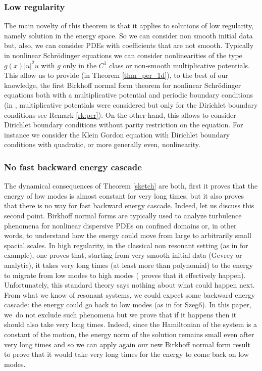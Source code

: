 \documentclass[JEP,XML,SOM,Unicode,NoEqCountersInSection,published]{cedram}
\theoremstyle{definition}
\begin{document}
\subsubsection*{Low regularity}
The main novelty of this theorem is that it applies to solutions of low regularity, namely solution in the energy space. So we can consider non smooth initial data but, also, we can consider PDEs with coefficients that are not smooth. Typically in nonlinear Schrödinger equations we can consider nonlinearities of the type $g(x)|u|^2u$ with $g$ only in the $C^1$ class or non-smooth multiplicative potentials. This allow us to provide (in Theorem \ref{thm_per_1d}), to the best of our knowledge, the first Birkhoff normal form theorem for nonlinear Schrödinger equations both with a multiplicative potential and periodic boundary conditions (in \cite{BG06}, multiplicative potentials were considered but only for the Dirichlet boundary conditions see Remark \ref{rk:per}). On the other hand, this allows to consider Dirichlet boundary conditions without parity restriction on the equation. For instance we consider the Klein Gordon equation with Dirichlet boundary conditions with quadratic, or more generally even, nonlinearity.

\subsubsection*{No fast backward energy cascade}
The dynamical consequences of Theorem \ref{sketch} are both, first it proves that the energy of low modes is almost constant for very long times, but it also proves that there is no way for fast backward energy cascade. Indeed, let us discuss this second point. Birkhoff normal forms are typically used to analyze turbulence phenomena for nonlinear dispersive PDEs on confined domains or, in other words, to understand how the energy could move from large to arbitrarily small spacial scales. In high regularity, in the classical non resonant setting (\ie as in \cite{BG06} for example), one proves that, starting from very smooth initial data (\eg Gevrey or analytic), it takes very long times (\ie at least more than polynomial) to the energy to migrate from low modes to high modes (\cite{Gua14} proves that it effectively happen). Unfortunately, this standard theory says nothing about what could happen next. From what we know of resonant systems, we could expect some backward energy cascade: the energy could go back to low modes (as in \cite{GG17} for Szegő). In this paper, we~do not exclude such phenomena but we prove that if it happens then it should also take very long times. Indeed, since the Hamiltonian of the system is a constant of the motion, the energy norm of the solution remains small even after very long times and so we can apply again our new Birkhoff normal form result to prove that it would take very long times for the energy to come back on low modes.
\end{document}
